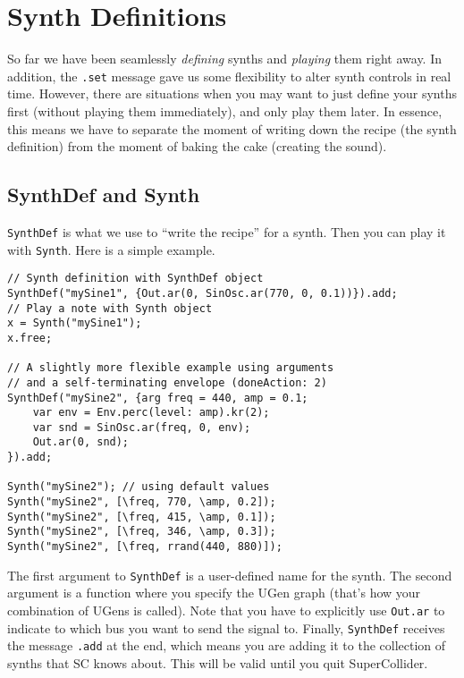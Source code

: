 \section{Synth Definitions}
\label{sec:synthdef}

So far we have been seamlessly \emph{defining} synths and  \emph{playing} them right away. In addition, the \texttt{.set} message gave us some flexibility to alter synth controls in real time. However, there are situations when you may want to just define your synths first (without playing them immediately), and only play them later. In essence, this means we have to separate the moment of writing down the recipe (the synth definition) from the moment of baking the cake (creating the sound).

\subsection{SynthDef and Synth}

\texttt{SynthDef} is what we use to ``write the recipe'' for a synth. Then you can play it with \texttt{Synth}. Here is a simple example.

\begin{lstlisting}[style=SuperCollider-IDE, basicstyle=\scttfamily\footnotesize]
// Synth definition with SynthDef object
SynthDef("mySine1", {Out.ar(0, SinOsc.ar(770, 0, 0.1))}).add;
// Play a note with Synth object
x = Synth("mySine1");
x.free;

// A slightly more flexible example using arguments
// and a self-terminating envelope (doneAction: 2)
SynthDef("mySine2", {arg freq = 440, amp = 0.1; 
	var env = Env.perc(level: amp).kr(2);
	var snd = SinOsc.ar(freq, 0, env);
	Out.ar(0, snd);
}).add;

Synth("mySine2"); // using default values
Synth("mySine2", [\freq, 770, \amp, 0.2]);
Synth("mySine2", [\freq, 415, \amp, 0.1]);
Synth("mySine2", [\freq, 346, \amp, 0.3]);
Synth("mySine2", [\freq, rrand(440, 880)]);
\end{lstlisting}

The first argument to \texttt{SynthDef} is a user-defined name for the synth. The second argument is a function where you specify the UGen graph (that's how your combination of UGens is called). Note that you have to explicitly use \texttt{Out.ar} to indicate to which bus you want to send the signal to. Finally, \texttt{SynthDef} receives the message \texttt{.add} at the end, which means you are adding it to the collection of synths that SC knows about. This will be valid until you quit SuperCollider.

